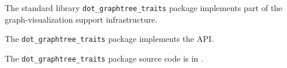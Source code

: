 
The standard library {\tt dot\_graphtree\_traits} package implements part of the graph-visualization support infrastructure.

The {\tt dot\_graphtree\_traits} package implements the  API.

The {\tt dot\_graphtree\_traits} package source code is in .



